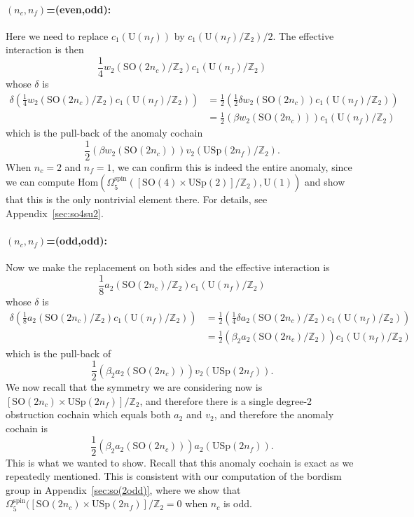 \documentclass[12pt]{article}
\numberwithin{equation}{section}
\def\bZ{\mathbb{Z}}
\def\U{\mathrm{U}}
\def\SO{\mathrm{SO}}
\def\USp{\mathrm{USp}}
\begin{document}
\paragraph{$(n_c,n_f)$=(even,odd):}
Here we need to replace $c_1(\U(n_f))$ by $c_1(\U(n_f)/\bZ_2)/2$.
The effective interaction is then \begin{equation}
\frac14 w_2(\SO(2n_c)/\bZ_2) c_1(\U(n_f)/\bZ_2) 
\end{equation} whose $\delta$ is \begin{align}
\delta(\frac14 w_2(\SO(2n_c)/\bZ_2) c_1(\U(n_f)/\bZ_2) )
&= \frac12 (\frac12\delta w_2(\SO(2n_c)) c_1(\U(n_f)/\bZ_2) ) \\
&= \frac12 (\beta w_2(\SO(2n_c)))c_1(\U(n_f)/\bZ_2) 
\end{align}
which is the pull-back of the anomaly cochain
\begin{equation}
 \frac12 (\beta w_2(\SO(2n_c)))v_2(\USp(2n_f)/\bZ_2). 
\end{equation}
When $n_c=2$ and $n_f=1$, we can confirm this is indeed the entire anomaly,
since we can compute $\mathrm{Hom}(\Omega^\text{spin}_5([\SO(4)\times \USp(2)]/\bZ_2),\U(1))$
and show that this is the only nontrivial element there.
For details, see Appendix~\ref{sec:so4su2}.

\paragraph{$(n_c,n_f)$=(odd,odd):}
Now we make the replacement on both sides and the effective interaction is \begin{equation}
\frac18 a_2(\SO(2n_c)/\bZ_2) c_1(\U(n_f)/\bZ_2) 
\end{equation}
whose $\delta$ is \begin{align}
\delta(\frac18 a_2(\SO(2n_c)/\bZ_2) c_1(\U(n_f)/\bZ_2) )
&= \frac12 (\frac14\delta a_2(\SO(2n_c)/\bZ_2) c_1(\U(n_f)/\bZ_2) ) \\
&= \frac12 (\beta_2 a_2(\SO(2n_c)/\bZ_2))c_1(\U(n_f)/\bZ_2) 
\end{align}
which is the pull-back of \begin{equation}
 \frac12 (\beta_2 a_2(\SO(2n_c)))v_2(\USp(2n_f)).
\end{equation}
We now recall that the symmetry we are considering now is $[\SO(2n_c)\times \USp(2n_f)]/\bZ_2$,
and therefore there is a single degree-2 obstruction cochain which equals both $a_2$ and $v_2$,
and therefore the anomaly cochain is \begin{equation}
 \frac12 (\beta_2 a_2(\SO(2n_c)))a_2(\USp(2n_f)).
\end{equation}
This is what we wanted to show.
Recall that this anomaly cochain is exact as we repeatedly mentioned.
This is consistent with our computation of the bordism group in Appendix~\ref{sec:so(2odd)},
where we show that $\Omega^\text{spin}_5([\SO(2n_c)\times \USp(2n_f)]/\bZ_2=0$ when $n_c$ is odd.
\end{document}
